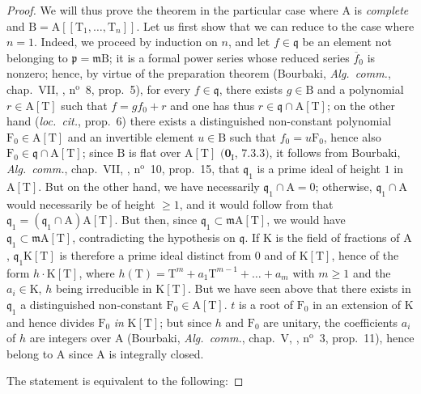 \begin{proof}
We will thus prove the theorem in the particular case where $\mathrm{A}$ is \emph{complete} and $\mathrm{B}=\mathrm{A}[[\mathrm{T}_1,\ldots,\mathrm{T}_n]]$.
Let us first show that we can reduce to the case where $n=1$.
Indeed, we proceed by induction on $n$, and let $f\in\mathfrak{q}$ be an element not belonging to $\mathfrak{p}=\mathfrak{m}\mathrm{B}$; it is a formal power series whose reduced series $\overline{f}_0$ is nonzero; hence, by virtue of the preparation theorem (Bourbaki, \emph{Alg.\ comm.}, chap.~VII, , n$^{\mathrm{o}}$~8, prop.~5), for every $f\in\mathfrak{q}$, there exists $g\in\mathrm{B}$ and a polynomial $r\in\mathrm{A}[\mathrm{T}]$ such that $f=gf_0+r$ and one has thus $r\in\mathfrak{q}\cap\mathrm{A}[\mathrm{T}]$; on the other hand (\emph{loc.\ cit.}, prop.~6) there exists a distinguished non-constant polynomial $\mathrm{F}_0\in\mathrm{A}[\mathrm{T}]$ and an invertible element $u\in\mathrm{B}$ such that $f_0=u\mathrm{F}_0$, hence also $\mathrm{F}_0\in\mathfrak{q}\cap\mathrm{A}[\mathrm{T}]$; since $\mathrm{B}$ is flat over $\mathrm{A}[\mathrm{T}]$ $(\mathbf{0}_{\mathrm{I}}$, $7.3.3)$, it follows from Bourbaki, \emph{Alg.\ comm.}, chap.~VII, , n$^{\mathrm{o}}$~10, prop.~15, that $\mathfrak{q}_1$ is a prime ideal of height $1$ in $\mathrm{A}[\mathrm{T}]$.
But on the other hand, we have necessarily $\mathfrak{q}_1\cap\mathrm{A}=0$; otherwise, $\mathfrak{q}_1\cap\mathrm{A}$ would necessarily be of height $\geq 1$, and it would follow from  that $\mathfrak{q}_1=(\mathfrak{q}_1\cap\mathrm{A})\mathrm{A}[\mathrm{T}]$.
But then, since $\mathfrak{q}_1\subset\mathfrak{m}\mathrm{A}[\mathrm{T}]$, we would have $\mathfrak{q}_1\subset\mathfrak{m}\mathrm{A}[\mathrm{T}]$, contradicting the hypothesis on $\mathfrak{q}$.
If $\mathrm{K}$ is the field of fractions of $\mathrm{A}$, $\mathfrak{q}_1\mathrm{K}[\mathrm{T}]$ is therefore a prime ideal distinct from $0$ and of $\mathrm{K}[\mathrm{T}]$, hence of the form $h\cdot\mathrm{K}[\mathrm{T}]$, where $h(\mathrm{T})=\mathrm{T}^m+a_1\mathrm{T}^{m-1}+\ldots+a_m$ with $m\geq 1$ and the $a_i\in\mathrm{K}$, $h$ being irreducible in $\mathrm{K}[\mathrm{T}]$.
But we have seen above that there exists in $\mathfrak{q}_1$ a distinguished non-constant $\mathrm{F}_0\in\mathrm{A}[\mathrm{T}]$.
$t$ is a root of $\mathrm{F}_0$ in an extension of $\mathrm{K}$ and hence divides $\mathrm{F}_0$ \emph{in} $\mathrm{K}[\mathrm{T}]$; but since $h$ and $\mathrm{F}_0$ are unitary, the coefficients $a_i$ of $h$ are integers over $\mathrm{A}$ (Bourbaki, \emph{Alg.\ comm.}, chap.~V, , n$^{\mathrm{o}}$~3, prop.~11), hence belong to $\mathrm{A}$ since $\mathrm{A}$ is integrally closed.

The statement  is equivalent to the following:
\end{proof}

